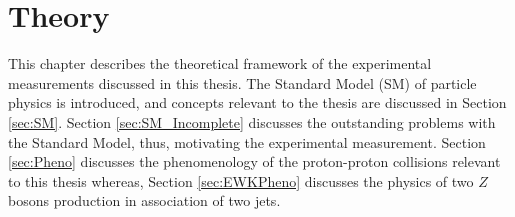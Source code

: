 \part{\LARGE{Theory}}
\label{sec:theory}

This chapter describes the theoretical framework of the experimental measurements discussed in this thesis. The Standard Model (SM) of particle physics is introduced, and concepts relevant to the thesis are discussed in Section \ref{sec:SM}. Section \ref{sec:SM_Incomplete} discusses the outstanding problems with the Standard Model, thus, motivating the experimental measurement. Section \ref{sec:Pheno} discusses the phenomenology of the proton-proton collisions relevant to this thesis whereas, Section \ref{sec:EWKPheno} discusses the physics of two $Z$ bosons production in association of two jets. 


